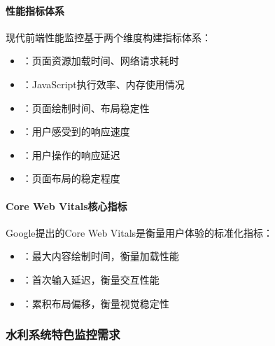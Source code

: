\hypertarget{ux6027ux80fdux6307ux6807ux4f53ux7cfb}{%
\paragraph{性能指标体系}\label{ux6027ux80fdux6307ux6807ux4f53ux7cfb}}

现代前端性能监控基于两个维度构建指标体系：


\begin{itemize}
\tightlist
\item
  ：页面资源加载时间、网络请求耗时
\item
  ：JavaScript执行效率、内存使用情况
\item
  ：页面绘制时间、布局稳定性
\end{itemize}


\begin{itemize}
\tightlist
\item
  ：用户感受到的响应速度
\item
  ：用户操作的响应延迟
\item
  ：页面布局的稳定程度
\end{itemize}

\hypertarget{core-web-vitalsux6838ux5fc3ux6307ux6807}{%
\paragraph{Core Web Vitals核心指标}\label{core-web-vitalsux6838ux5fc3ux6307ux6807}}

Google提出的Core Web Vitals是衡量用户体验的标准化指标：

\begin{itemize}
\tightlist
\item
  ：最大内容绘制时间，衡量加载性能
\item
  ：首次输入延迟，衡量交互性能\\
\item
  ：累积布局偏移，衡量视觉稳定性
\end{itemize}

\hypertarget{ux6c34ux5229ux7cfbux7edfux7279ux8272ux76d1ux63a7ux9700ux6c42}{%
\subsubsection{水利系统特色监控需求}\label{ux6c34ux5229ux7cfbux7edfux7279ux8272ux76d1ux63a7ux9700ux6c42}}


